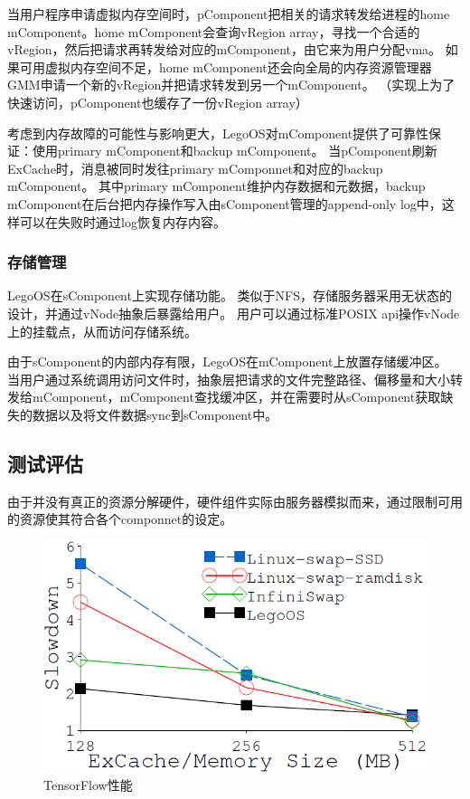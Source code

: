 当用户程序申请虚拟内存空间时，pComponent把相关的请求转发给进程的home mComponent。home mComponent会查询vRegion array，寻找一个合适的vRegion，然后把请求再转发给对应的mComponent，由它来为用户分配vma。
如果可用虚拟内存空间不足，home mComponent还会向全局的内存资源管理器GMM申请一个新的vRegion并把请求转发到另一个mComponent。
（实现上为了快速访问，pComponent也缓存了一份vRegion array）

考虑到内存故障的可能性与影响更大，LegoOS对mComponent提供了可靠性保证：使用primary mComponent和backup mComponent。
当pComponent刷新ExCache时，消息被同时发往primary mComponnet和对应的backup mComponent。
其中primary mComponent维护内存数据和元数据，backup mComponent在后台把内存操作写入由sComponent管理的append-only log中，这样可以在失败时通过log恢复内存内容。

\subsubsection{存储管理}

LegoOS在sComponent上实现存储功能。
类似于NFS，存储服务器采用无状态的设计，并通过vNode抽象后暴露给用户。
用户可以通过标准POSIX api操作vNode上的挂载点，从而访问存储系统。

由于sComponent的内部内存有限，LegoOS在mComponent上放置存储缓冲区。
当用户通过系统调用访问文件时，抽象层把请求的文件完整路径、偏移量和大小转发给mComponent，mComponent查找缓冲区，并在需要时从sComponent获取缺失的数据以及将文件数据sync到sComponent中。

\subsection{测试评估}

由于并没有真正的资源分解硬件，硬件组件实际由服务器模拟而来，通过限制可用的资源使其符合各个componnet的设定。

\begin{figure}[h]
\centering
\includegraphics[scale=0.50]{Figures/system/tensorflow_perf.png}
\decoRule
\caption{TensorFlow性能}    %
\label{fig:tensorflow_perf}
\end{figure}

